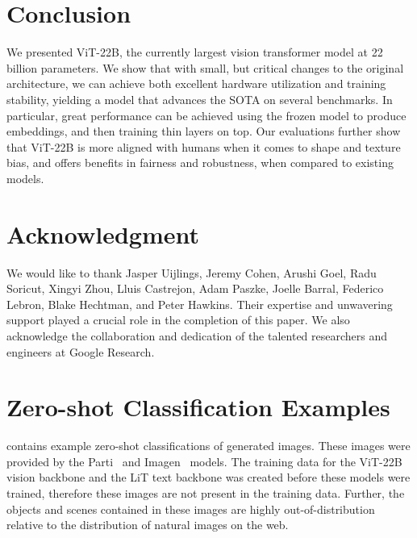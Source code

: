 \documentclass{article}
\newcommand{\chonk}{\mbox{ViT-22B}\xspace}
\begin{document}
 \section{Conclusion}
\label{sec:conclusion}
We presented \chonk, the currently largest  vision transformer model at 22 billion parameters.
We show that with small, but critical changes to the original architecture, we can achieve both excellent hardware utilization and training stability, yielding a model that advances the SOTA on several benchmarks.
In particular, great performance can be achieved using the frozen model to produce embeddings, and then training thin layers on top.
Our evaluations further show that \chonk is more aligned with humans when it comes to shape and texture bias, and offers benefits in fairness and robustness, when compared to existing models.





 
\section*{Acknowledgment}
We would like to thank Jasper Uijlings, Jeremy Cohen, Arushi Goel, Radu Soricut, Xingyi Zhou, Lluis Castrejon, Adam Paszke, Joelle Barral, Federico Lebron, Blake Hechtman, and Peter Hawkins. Their expertise and unwavering support played a crucial role in the completion of this paper. We also acknowledge the collaboration and dedication of the talented researchers and engineers at Google Research.




\appendix
\onecolumn
\section{Zero-shot Classification Examples}
\label{app:lit}

 contains example zero-shot classifications of generated images.
These images were provided by the Parti~\citep{parti} and Imagen~\citep{imagen} models.
The training data for the ViT-22B vision backbone and the LiT text backbone was created before these models were trained, therefore these images are not present in the training data. 
Further, the objects and scenes contained in these images are highly out-of-distribution relative to the distribution of natural images on the web.
\end{document}
